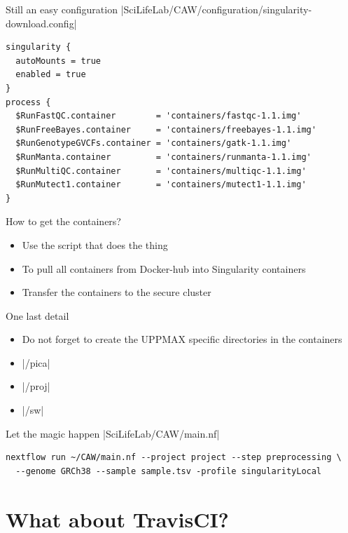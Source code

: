 \documentclass{beamer}
\begin{document}
\begin{frame}[fragile]{Still an easy configuration}
	|SciLifeLab/CAW/configuration/singularity-download.config|
\begin{verbatim}
singularity {
  autoMounts = true
  enabled = true
}
process {
  $RunFastQC.container        = 'containers/fastqc-1.1.img'
  $RunFreeBayes.container     = 'containers/freebayes-1.1.img'
  $RunGenotypeGVCFs.container = 'containers/gatk-1.1.img'
  $RunManta.container         = 'containers/runmanta-1.1.img'
  $RunMultiQC.container       = 'containers/multiqc-1.1.img'
  $RunMutect1.container       = 'containers/mutect1-1.1.img'
}
\end{verbatim}
\end{frame}

\begin{frame}{How to get the containers?}
	\begin{itemize}
		\item Use the script that does the thing
		\pause
		\item To pull all containers from Docker-hub into Singularity containers
		\pause
		\item Transfer the containers to the secure cluster
	\end{itemize}
\end{frame}

\begin{frame}{One last detail}
	\begin{itemize}
		\item Do not forget to create the UPPMAX specific directories in the containers
		\pause
		\item {}|/pica|
		\pause
		\item {}|/proj|
		\pause
		\item {}|/sw|
	\end{itemize}
\end{frame}


\begin{frame}[fragile]{Let the magic happen}
|SciLifeLab/CAW/main.nf|
\begin{verbatim}
nextflow run ~/CAW/main.nf --project project --step preprocessing \
  --genome GRCh38 --sample sample.tsv -profile singularityLocal
\end{verbatim}
\end{frame}

\section{What about TravisCI?}
\end{document}
